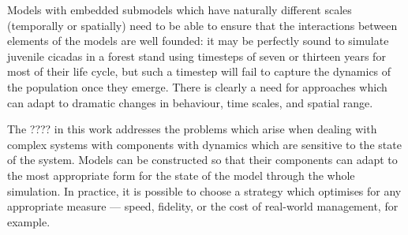 Models with embedded submodels which have naturally different scales
(temporally or spatially) need to be able to ensure that the
interactions between elements of the models are well founded: it may
be perfectly sound to simulate juvenile cicadas in a forest stand
using timesteps of seven or thirteen years for most of their life
cycle, but such a timestep will fail to capture the dynamics of the
population once they emerge.  There is clearly a need for approaches
which can adapt to dramatic changes in behaviour, time scales, and
spatial range.







The  ???? in this work addresses the problems which arise when dealing
with complex systems with components with dynamics which are sensitive
to the state of the system.  Models can be constructed so that their
components can adapt to the most appropriate form for the state of the
model through the whole simulation. In practice, it is possible to
choose a strategy which optimises for any appropriate measure ---
speed, fidelity, or the cost of real-world management, for example.

